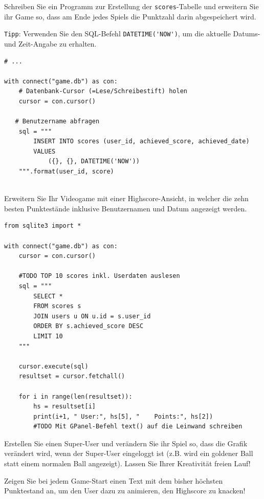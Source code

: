 \begin{myexercise}
Schreiben Sie ein Programm zur Erstellung der \texttt{scores}-Tabelle und erweitern Sie ihr Game so, dass am Ende jedes Spiels die Punktzahl darin abgespeichert wird.

\texttt{Tipp}: Verwenden Sie den SQL-Befehl \lstinline[style=sql]|DATETIME('NOW')|, um die aktuelle Datums- und Zeit-Angabe zu erhalten.
\begin{myanswer}
\begin{lstlisting}
# ...

with connect("game.db") as con:
    # Datenbank-Cursor (=Lese/Schreibestift) holen
    cursor = con.cursor()

   # Benutzername abfragen
    sql = """
        INSERT INTO scores (user_id, achieved_score, achieved_date)
        VALUES
            ({}, {}, DATETIME('NOW'))
    """.format(user_id, score)
 

\end{lstlisting}
\end{myanswer}
\end{myexercise}

\begin{myexercise}
Erweitern Sie Ihr Videogame mit einer Highscore-Ansicht, in welcher die zehn besten Punktestände inklusive Benutzernamen und Datum angezeigt werden.
\begin{myanswer}
\begin{lstlisting}
from sqlite3 import *

with connect("game.db") as con:
    cursor = con.cursor()
    
    #TODO TOP 10 scores inkl. Userdaten auslesen
    sql = """
        SELECT *
        FROM scores s
        JOIN users u ON u.id = s.user_id
        ORDER BY s.achieved_score DESC
        LIMIT 10
    """
    
    cursor.execute(sql)
    resultset = cursor.fetchall()
    
    for i in range(len(resultset)):
        hs = resultset[i]
        print(i+1, " User:", hs[5], "    Points:", hs[2])
        #TODO Mit GPanel-Befehl text() auf die Leinwand schreiben
\end{lstlisting}
\end{myanswer}

\end{myexercise}

\begin{mychallenge}
Erstellen Sie einen Super-User und verändern Sie ihr Spiel so, dass die Grafik verändert wird, wenn der Super-User eingeloggt ist (z.B. wird ein goldener Ball statt einem normalen Ball angezeigt). Lassen Sie Ihrer Kreativität freien Lauf!
\end{mychallenge}

\begin{mychallenge}
Zeigen Sie bei jedem Game-Start einen Text mit dem bisher höchsten Punktestand an, um den User dazu zu animieren, den Highscore zu knacken!
\end{mychallenge}